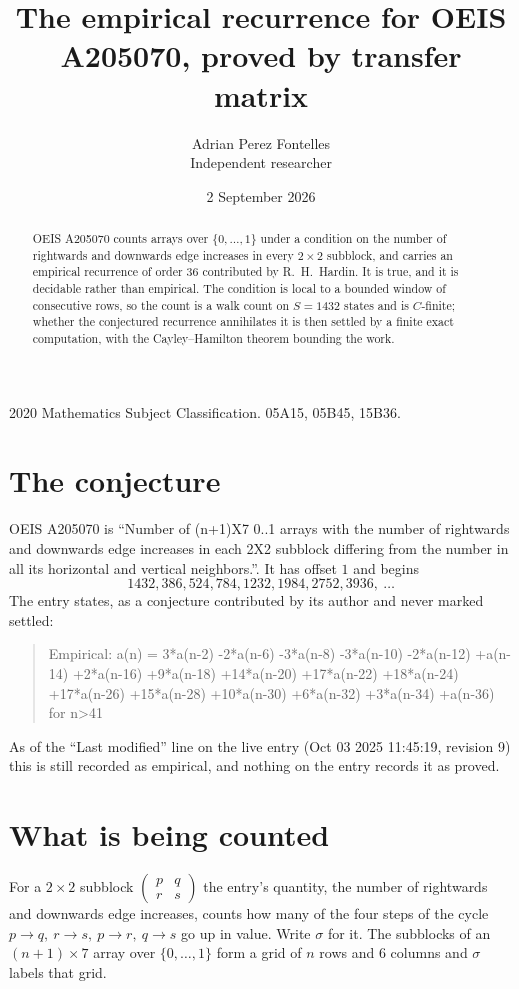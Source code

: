 \documentclass[11pt,a4paper]{article}
\title{The empirical recurrence for OEIS A205070, proved by transfer matrix}
\author{Adrian Perez Fontelles\\ \small Independent researcher}
\date{2 September 2026}
\theoremstyle{plain}
\theoremstyle{definition}
\begin{document}
\maketitle

\begin{abstract}
OEIS A205070 counts arrays over $\{0,\dots,1\}$ under a condition on the number of rightwards and downwards edge increases
in every $2\times2$ subblock, and carries an empirical recurrence of order $36$ contributed by
R.~H.~Hardin. It is true, and it is decidable rather than empirical. The condition is local to
a bounded window of consecutive rows, so the count is a walk count on $S=1432$ states and is
$C$-finite; whether the conjectured recurrence annihilates it is then settled by a finite exact
computation, with the Cayley--Hamilton theorem bounding the work.
\end{abstract}

\noindent\small 2020 Mathematics Subject Classification. 05A15, 05B45, 15B36.\normalsize

\section{The conjecture}

OEIS A205070 is ``Number of (n+1)X7 0..1 arrays with the number of rightwards and downwards edge increases in each 2X2 subblock differing from the number in all its horizontal and vertical neighbors.''. It has offset $1$ and begins
\[
1432, 386, 524, 784, 1232, 1984, 2752, 3936,\ \dots
\]
The entry states, as a conjecture contributed by its author and never marked settled:
\begin{quote}
Empirical: a(n) = 3*a(n-2) -2*a(n-6) -3*a(n-8) -3*a(n-10) -2*a(n-12) +a(n-14) +2*a(n-16) +9*a(n-18) +14*a(n-20) +17*a(n-22) +18*a(n-24) +17*a(n-26) +15*a(n-28) +10*a(n-30) +6*a(n-32) +3*a(n-34) +a(n-36) for n>41
\end{quote}
As of the ``Last modified'' line on the live entry (Oct 03 2025 11:45:19, revision 9) this is still
recorded as empirical, and nothing on the entry records it as proved.

\section{What is being counted}

For a $2\times2$ subblock $\begin{pmatrix}p&q\\r&s\end{pmatrix}$ the
entry's quantity, the number of rightwards and downwards edge increases, counts how many of the four steps of the cycle $p\to q,\ r\to s,\ p\to r,\ q\to s$ go up in value. Write $\sigma$ for it. The subblocks of an
$(n+1)\times7$ array over $\{0,\dots,1\}$ form a grid of $n$ rows and $6$
columns and $\sigma$ labels that grid.
\end{document}
